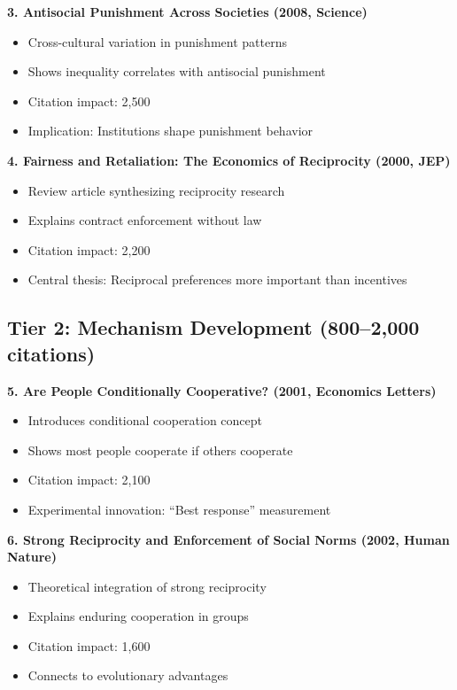 \documentclass[11pt]{article}
\begin{document}
\textbf{3. Antisocial Punishment Across Societies (2008, Science)}
\begin{itemize}
    \item Cross-cultural variation in punishment patterns
    \item Shows inequality correlates with antisocial punishment
    \item Citation impact: 2,500
    \item Implication: Institutions shape punishment behavior
\end{itemize}

\textbf{4. Fairness and Retaliation: The Economics of Reciprocity (2000, JEP)}
\begin{itemize}
    \item Review article synthesizing reciprocity research
    \item Explains contract enforcement without law
    \item Citation impact: 2,200
    \item Central thesis: Reciprocal preferences more important than incentives
\end{itemize}

\subsection*{Tier 2: Mechanism Development (800–2,000 citations)}

\textbf{5. Are People Conditionally Cooperative? (2001, Economics Letters)}
\begin{itemize}
    \item Introduces conditional cooperation concept
    \item Shows most people cooperate if others cooperate
    \item Citation impact: 2,100
    \item Experimental innovation: ``Best response'' measurement
\end{itemize}

\textbf{6. Strong Reciprocity and Enforcement of Social Norms (2002, Human Nature)}
\begin{itemize}
    \item Theoretical integration of strong reciprocity
    \item Explains enduring cooperation in groups
    \item Citation impact: 1,600
    \item Connects to evolutionary advantages
\end{itemize}
\end{document}
